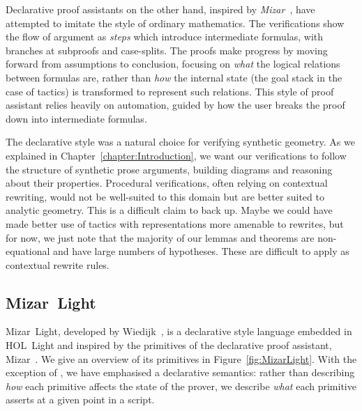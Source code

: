Declarative proof assistants on the other hand, inspired by \emph{Mizar}~\cite{MizarMathematicalVernacular}, have attempted to imitate the style of ordinary mathematics. The verifications show the flow of argument as \emph{steps} which introduce intermediate formulas, with branches at subproofs and case-splits. The proofs make progress by moving forward from assumptions to conclusion, focusing on \emph{what} the logical relations between formulas are, rather than \emph{how} the internal state (the goal stack in the case of tactics) is transformed to represent such relations. This style of proof assistant relies heavily on automation, guided by how the user breaks the proof down into intermediate formulas.

The declarative style was a natural choice for verifying synthetic geometry. As we explained in Chapter~\ref{chapter:Introduction}, we want our verifications to follow the structure of synthetic prose arguments, building diagrams and reasoning about their properties. Procedural verifications, often relying on contextual rewriting, would not be well-suited to this domain but are better suited to analytic geometry. This is a difficult claim to back up. Maybe we could have made better use of tactics with representations more amenable to rewrites, but for now, we just note that the majority of our lemmas and theorems are non-equational and have large numbers of hypotheses. These are difficult to apply as contextual rewrite rules.

\subsection{Mizar~Light}\label{sec:MizarLight}
Mizar~Light, developed by Wiedijk~\cite{MizarLight}, is a declarative style language embedded in HOL~Light and inspired by the primitives of the declarative proof assistant, Mizar~\cite{MizarMathematicalVernacular}. We give an overview of its primitives in Figure~\ref{fig:MizarLight}. With the exception of , we have emphasised a declarative semantics: rather than describing \emph{how} each primitive affects the state of the prover, we describe \emph{what} each primitive asserts at a given point in a script.

